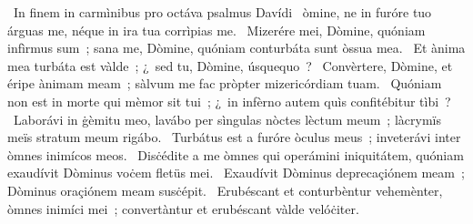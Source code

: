 {~In finem in carmìnibus pro octáva psalmus Davídi}
{%
~òmine, ne in furóre tuo árguas me, néque in ira tua corrìpias me.
~Mizerére mei, Dòmine, quóniam infìrmus sum~; sana me, Dòmine, quóniam conturbáta sunt òssua mea.
~Et ànima mea turbáta est vàlde~; ¿~sed tu, Dòmine, úsquequo~?
~Convèrtere, Dòmine, et éripe ànimam meam~; sàlvum me fac pròpter mizericórdiam tuam.
~Quóniam non est in morte qui mèmor sit tui~; ¿~in infèrno autem quìs confitébitur tìbi~?
~Laborávi in ġèmitu meo, lavábo per sìngulas nòctes lèctum meum~; làcrymïs meïs stratum meum rigábo.
~Turbátus est a furóre òculus meus~; inveterávi inter òmnes inimícos meos.
~Disċédite a me òmnes qui operámini iniquitátem, quóniam exaudívit Dòminus voċem fletüs mei.
~Exaudívit Dòminus deprecaçiónem meam~; Dòminus oraçiónem meam susċépit.
~Erubéscant et conturbèntur vehemènter, òmnes inimíci mei~; convertàntur et erubéscant vàlde velóċiter.}
